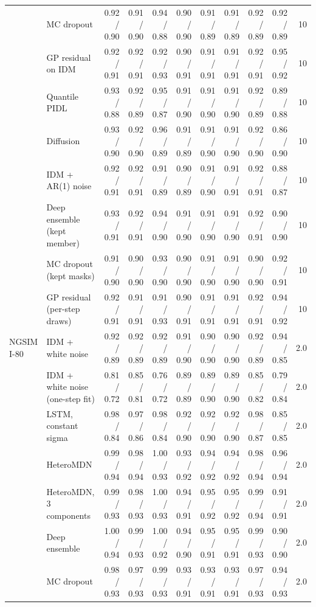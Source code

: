 \begin{longtable}{llrrrrrrrrr}
 & MC dropout & 0.92 / 0.90 & 0.91 / 0.90 & 0.94 / 0.88 & 0.90 / 0.90 & 0.91 / 0.89 & 0.91 / 0.89 & 0.92 / 0.89 & 0.92 / 0.89 & 10 \\
 & GP residual on IDM & 0.92 / 0.91 & 0.92 / 0.91 & 0.92 / 0.93 & 0.90 / 0.91 & 0.91 / 0.91 & 0.91 / 0.91 & 0.92 / 0.91 & 0.95 / 0.92 & 10 \\
 & Quantile PIDL & 0.93 / 0.88 & 0.92 / 0.89 & 0.95 / 0.87 & 0.91 / 0.90 & 0.91 / 0.90 & 0.91 / 0.90 & 0.92 / 0.89 & 0.89 / 0.88 & 10 \\
 & Diffusion & 0.93 / 0.90 & 0.92 / 0.90 & 0.96 / 0.89 & 0.91 / 0.89 & 0.91 / 0.90 & 0.91 / 0.90 & 0.92 / 0.90 & 0.86 / 0.90 & 10 \\
 & IDM + AR(1) noise & 0.92 / 0.91 & 0.92 / 0.91 & 0.91 / 0.89 & 0.90 / 0.89 & 0.91 / 0.90 & 0.91 / 0.91 & 0.92 / 0.91 & 0.88 / 0.87 & 10 \\
 & Deep ensemble (kept member) & 0.93 / 0.91 & 0.92 / 0.91 & 0.94 / 0.90 & 0.91 / 0.90 & 0.91 / 0.90 & 0.91 / 0.90 & 0.92 / 0.91 & 0.90 / 0.90 & 10 \\
 & MC dropout (kept masks) & 0.91 / 0.90 & 0.90 / 0.90 & 0.93 / 0.90 & 0.90 / 0.90 & 0.91 / 0.90 & 0.91 / 0.90 & 0.90 / 0.90 & 0.92 / 0.91 & 10 \\
 & GP residual (per-step draws) & 0.92 / 0.91 & 0.91 / 0.91 & 0.91 / 0.93 & 0.90 / 0.91 & 0.91 / 0.91 & 0.91 / 0.91 & 0.92 / 0.91 & 0.94 / 0.92 & 10 \\
\midrule
NGSIM I-80 & IDM + white noise & 0.92 / 0.89 & 0.92 / 0.89 & 0.92 / 0.89 & 0.91 / 0.90 & 0.90 / 0.90 & 0.90 / 0.90 & 0.92 / 0.89 & 0.94 / 0.85 & 2.0 \\
 & IDM + white noise (one-step fit) & 0.81 / 0.72 & 0.85 / 0.81 & 0.76 / 0.72 & 0.89 / 0.89 & 0.89 / 0.90 & 0.89 / 0.90 & 0.85 / 0.82 & 0.79 / 0.84 & 2.0 \\
 & LSTM, constant sigma & 0.98 / 0.84 & 0.97 / 0.86 & 0.98 / 0.84 & 0.92 / 0.90 & 0.92 / 0.90 & 0.92 / 0.90 & 0.98 / 0.87 & 0.85 / 0.85 & 2.0 \\
 & HeteroMDN & 0.99 / 0.94 & 0.98 / 0.94 & 1.00 / 0.93 & 0.93 / 0.92 & 0.94 / 0.92 & 0.94 / 0.92 & 0.98 / 0.94 & 0.96 / 0.94 & 2.0 \\
 & HeteroMDN, 3 components & 0.99 / 0.93 & 0.98 / 0.93 & 1.00 / 0.93 & 0.94 / 0.91 & 0.95 / 0.92 & 0.95 / 0.92 & 0.99 / 0.94 & 0.91 / 0.91 & 2.0 \\
 & Deep ensemble & 1.00 / 0.94 & 0.99 / 0.93 & 1.00 / 0.92 & 0.94 / 0.90 & 0.95 / 0.91 & 0.95 / 0.91 & 0.99 / 0.93 & 0.90 / 0.90 & 2.0 \\
 & MC dropout & 0.98 / 0.93 & 0.97 / 0.93 & 0.99 / 0.93 & 0.93 / 0.91 & 0.93 / 0.91 & 0.93 / 0.91 & 0.97 / 0.93 & 0.94 / 0.93 & 2.0 \\

\end{longtable}
